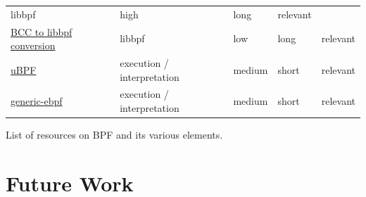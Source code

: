 \documentclass[conference]{IEEEtran}
\newcommand\bashstyle{
	\lstset{
		language=Bash,
		basicstyle=\ttm,
		showstringspaces=false,
		tabsize=2,
		aboveskip=0.2cm,
		belowskip=0.2cm,
		prebreak=\textbackslash,
		extendedchars=true,
		mathescape=false,
		linewidth=8.85cm,
		breaklines=true
	}
}
\newcommand\bashexternal[2][]{{\bashstyle}}
\newcommand\cstyle{
	\lstset{
		language=c,
		basicstyle=\ttm,
		showstringspaces=false,
		tabsize=4,
		aboveskip=0.2cm,
		belowskip=0.2cm,
		otherkeywords={self},             %
		keywordstyle=\ttb\color{deepblue},
		emph={MyClass,__init__},          %
		emphstyle=\ttb\color{deepred},    %
		stringstyle=\color{deepgreen},
		frame=tb,                          %
		prebreak=\textbackslash,
		linewidth=8.85cm,
		breaklines=true,
	}
}
\newcommand\cexternal[2][]{{\cstyle}}
\begin{document}
\begin{table}[h!]
\begin{adjustbox}{width=0.5\textwidth}
\begin{threeparttable}[]
\begin{tabular}{lllll}
				libbpf & high & long & relevant \\
				\href{https://facebookmicrosites.github.io/bpf/blog/2020/02/20/bcc-to-libbpf-howto-guide.html}{BCC to libbpf conversion}\cite{libbpfconversion} &
				libbpf & low & long & relevant \\
				\href{https://github.com/iovisor/ubpf}{uBPF}\cite{ubpf} &
				execution / interpretation & medium & short & relevant \\
				\href{https://github.com/generic-ebpf/generic-ebpf}{generic-ebpf}\cite{generic-ebpf} &
				execution / interpretation & medium & short & relevant \\
				\bottomrule
			\end{tabular}
			\begin{tablenotes}
				\centering List of resources on BPF and its various elements.
			\end{tablenotes}
		\end{threeparttable}
	\end{adjustbox}
\end{table}

\section{Future Work} \label{future}

%


\end{document}
